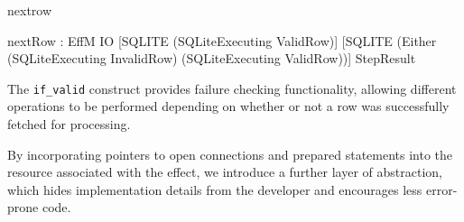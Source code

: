 \noindent
\begin{SaveVerbatim}{nextrow}

nextRow : EffM IO [SQLITE (SQLiteExecuting ValidRow)] 
         [SQLITE (Either (SQLiteExecuting InvalidRow)
                 (SQLiteExecuting ValidRow))] StepResult

\end{SaveVerbatim}

\noindent
The \texttt{if\_valid} construct provides failure checking functionality, allowing different operations to be performed depending on whether or not a row was successfully fetched for processing.





By incorporating pointers to open connections and prepared statements into the
resource associated with the effect, we introduce a further layer of
abstraction, which hides implementation details from the developer and
encourages less error-prone code. 

